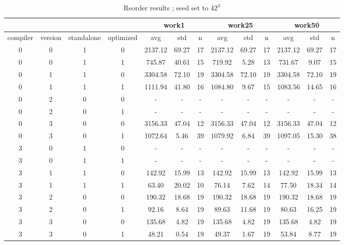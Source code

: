 \documentclass[a4paper,11pt]{scrartcl}
\begin{document}
\begin{table}[h!]
\footnotesize
\begin{center}
 \begin{tabular}{|c|c|c|c|c|c|c||c|c|c|c|c|c|} 
 \hline
 \multicolumn{4}{|c|}{ } & \multicolumn{3}{|c||}{ work1 } & \multicolumn{3}{|c|}{ work25 } & \multicolumn{3}{c|}{work50}\\
 \hline
compiler & version & standalone & optimized & avg & std & n & avg & std & n & avg & std & n \\
\hline
0 & 0 & 1 & 0 & 2137.12 & 69.27 & 17 & 2137.12 & 69.27 & 17 & 2137.12 & 69.27 & 17 \\ 
0 & 0 & 1 & 1 & 745.87 & 40.61 & 15 & 719.92 & 5.28 & 13 & 731.67 & 9.07 & 15 \\ 
0 & 1 & 1 & 0 & 3304.58 & 72.10 & 19 & 3304.58 & 72.10 & 19 & 3304.58 & 72.10 & 19 \\ 
0 & 1 & 1 & 1 & 1111.94 & 41.80 & 16 & 1084.80 & 9.67 & 15 & 1083.56 & 14.65 & 16 \\ 
0 & 2 & 0 & 0 & - & - & - & - & - & - & - & - & - \\ 
0 & 2 & 0 & 1 & - & - & - & - & - & - & - & - & - \\ 
0 & 3 & 0 & 0 & 3156.33 & 47.04 & 12 & 3156.33 & 47.04 & 12 & 3156.33 & 47.04 & 12 \\ 
0 & 3 & 0 & 1 & 1072.64 & 5.46 & 39 & 1079.92 & 6.84 & 39 & 1097.05 & 15.30 & 38 \\ 
3 & 0 & 1 & 0 & - & - & - & - & - & - & - & - & - \\ 
3 & 0 & 1 & 1 & - & - & - & - & - & - & - & - & - \\ 
3 & 1 & 1 & 0 & 142.92 & 15.99 & 13 & 142.92 & 15.99 & 13 & 142.92 & 15.99 & 13 \\ 
3 & 1 & 1 & 1 & 63.40 & 20.02 & 10 & 76.14 & 7.62 & 14 & 77.50 & 18.34 & 14 \\ 
3 & 2 & 0 & 0 & 190.32 & 18.68 & 19 & 190.32 & 18.68 & 19 & 190.32 & 18.68 & 19 \\ 
3 & 2 & 0 & 1 & 92.16 & 8.64 & 19 & 89.63 & 11.68 & 19 & 80.63 & 16.25 & 19 \\ 
3 & 3 & 0 & 0 & 135.68 & 4.82 & 19 & 135.68 & 4.82 & 19 & 135.68 & 4.82 & 19 \\ 
3 & 3 & 0 & 1 & 48.21 & 0.54 & 19 & 49.37 & 1.67 & 19 & 53.84 & 8.77 & 19 \\ 
\hline
\end{tabular}
\end{center}
\caption{Reorder results ; seed set to $42^3$ }
\label{tbl:reorder-results}
\end{table}
\end{document}

